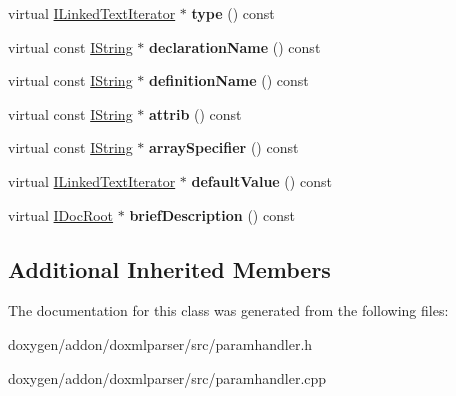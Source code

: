\begin{DoxyCompactItemize}
\item 
\mbox{\label{class_param_handler_a9abf6e6c358ba4ff194da5a5be43b4be}} 
virtual \mbox{\hyperlink{class_i_linked_text_iterator}{I\+Linked\+Text\+Iterator}} $\ast$ {\bfseries type} () const
\item 
\mbox{\label{class_param_handler_a9c984f78b7c480d314a24341a5873bc5}} 
virtual const \mbox{\hyperlink{class_i_string}{I\+String}} $\ast$ {\bfseries declaration\+Name} () const
\item 
\mbox{\label{class_param_handler_a7c0b1a5f36273d1a4f549a34df5ca124}} 
virtual const \mbox{\hyperlink{class_i_string}{I\+String}} $\ast$ {\bfseries definition\+Name} () const
\item 
\mbox{\label{class_param_handler_afb993a7fc715ecd746914f4978057f57}} 
virtual const \mbox{\hyperlink{class_i_string}{I\+String}} $\ast$ {\bfseries attrib} () const
\item 
\mbox{\label{class_param_handler_ab303788f044fa596a64135ac0c3b4b89}} 
virtual const \mbox{\hyperlink{class_i_string}{I\+String}} $\ast$ {\bfseries array\+Specifier} () const
\item 
\mbox{\label{class_param_handler_a818a88b7eb195b308dcf9a84b71aa459}} 
virtual \mbox{\hyperlink{class_i_linked_text_iterator}{I\+Linked\+Text\+Iterator}} $\ast$ {\bfseries default\+Value} () const
\item 
\mbox{\label{class_param_handler_abd3a5d05c8ee8b25420af92f182788ee}} 
virtual \mbox{\hyperlink{class_i_doc_root}{I\+Doc\+Root}} $\ast$ {\bfseries brief\+Description} () const
\end{DoxyCompactItemize}
\subsection*{Additional Inherited Members}


The documentation for this class was generated from the following files\+:\begin{DoxyCompactItemize}
\item 
doxygen/addon/doxmlparser/src/paramhandler.\+h\item 
doxygen/addon/doxmlparser/src/paramhandler.\+cpp\end{DoxyCompactItemize}

